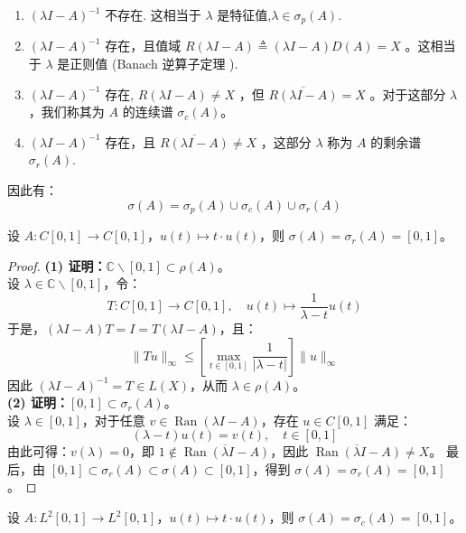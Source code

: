 \documentclass[lang=cn,newtx,10pt,scheme=chinese,thmcnt=chapter]{elegantbook}
\begin{document}
\begin{definition}
\begin{enumerate}
    \item $(\lambda I-A)^{-1}$ 不存在. 这相当于 $\lambda$ 是特征值,$\lambda \in \sigma_p(A)$.
    \item  $(\lambda I-A)^{-1}$ 存在，且值域 $R(\lambda I-A) \triangleq(\lambda I-A) D(A)= X$ 。这相当于 $\lambda$ 是正则值 (Banach 逆算子定理 ).
    \item  $(\lambda I-A)^{-1}$ 存在, $R(\lambda I-A) \neq X$ ，但 $\overline{R(\lambda I-A)}= X$ 。对于这部分 $\lambda$ ，我们称其为 $A$ 的连续谱 $\sigma_c(A)$。
    \item  $(\lambda I-A)^{-1}$ 存在，且 $\overline{R(\lambda I-A)} \neq X$ ，这部分 $\lambda$ 称为 $A$ 的剩余谱 $\sigma_r(A)$.

    
\end{enumerate}
因此有：
\begin{equation*}
\sigma(A)=\sigma_p(A) \cup \sigma_c(A) \cup \sigma_r(A)
\end{equation*}
\end{definition}

\begin{example}
设 $A: C[0,1] \rightarrow C[0,1]$，$u(t) \mapsto t \cdot u(t)$，则 $\sigma(A) = \sigma_r(A) = [0,1]$。


\end{example}
\begin{proof}
\textbf{(1) 证明：}$\mathbb{C} \backslash [0,1] \subset \rho(A)$。\\
设 $\lambda \in \mathbb{C} \backslash [0,1]$，令：
\[
T: C[0,1] \rightarrow C[0,1], \quad u(t) \mapsto \frac{1}{\lambda - t} u(t)
\]
于是，$(\lambda I - A) T = I = T(\lambda I - A)$，且：
\[
\|T u\|_{\infty} \leqslant \left[\max_{t \in [0,1]} \frac{1}{|\lambda - t|}\right] \|u\|_{\infty}
\]
因此 $(\lambda I - A)^{-1} = T \in L(X)$，从而 $\lambda \in \rho(A)$。\\
\textbf{(2) 证明：}$[0,1] \subset \sigma_r(A)$。\\
设 $\lambda \in [0,1]$，对于任意 $v \in \operatorname{Ran}(\lambda I - A)$，存在 $u \in C[0,1]$ 满足：
\[
(\lambda - t) u(t) = v(t), \quad t \in [0,1]
\]
由此可得：$v(\lambda) = 0$，即 $1 \notin \overline{\operatorname{Ran}(\lambda I - A)}$，因此 $\overline{\operatorname{Ran}(\lambda I - A)} \neq X$。
最后，由 $[0,1] \subset \sigma_r(A) \subset \sigma(A) \subset [0,1]$，得到 $\sigma(A) = \sigma_r(A) = [0,1]$。
\end{proof}
\begin{example}
设 $A: L^2[0,1] \rightarrow L^2[0,1]$，$u(t) \mapsto t \cdot u(t)$，则 $\sigma(A) = \sigma_c(A) = [0,1]$。
\end{example}
\end{document}
